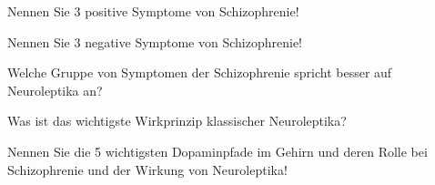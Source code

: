 \documentclass[10pt, a4paper]{exam}
\begin{document}
\begin{questions}
\begin{solution}
  \end{solution}

  \question Nennen Sie 3 positive Symptome von Schizophrenie!
  \begin{solution}

  \end{solution}

  \question Nennen Sie 3 negative Symptome von Schizophrenie!
  \begin{solution}

  \end{solution}

  \question Welche Gruppe von Symptomen der Schizophrenie spricht besser auf Neuroleptika an?
  \begin{solution}

  \end{solution}

  \question Was ist das wichtigste Wirkprinzip klassischer Neuroleptika?
  \begin{solution}

  \end{solution}

  \question Nennen Sie die 5 wichtigsten Dopaminpfade im Gehirn und deren Rolle bei Schizophrenie und der Wirkung von Neuroleptika!
  \begin{solution}

  \end{solution}
\end{questions}
\end{document}
